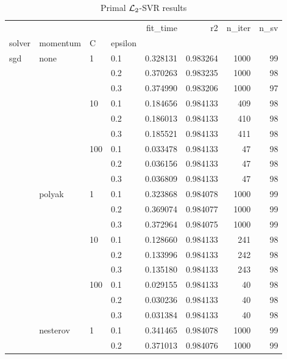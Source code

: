 \begin{table}[H]
\centering
\caption{Primal $\protect \mathcal{L}_2$-SVR results}
\label{primal_l2_svr_cv_results}
\begin{tabular}{llllrrrr}
\toprule
          &   &     &     &  fit\_time &        r2 &  n\_iter &  n\_sv \\
solver & momentum & C & epsilon &           &           &         &       \\
\midrule
sgd & none & 1   & 0.1 &  0.328131 &  0.983264 &    1000 &    99 \\
          &   &     & 0.2 &  0.370263 &  0.983235 &    1000 &    98 \\
          &   &     & 0.3 &  0.374990 &  0.983206 &    1000 &    97 \\
          &   & 10  & 0.1 &  0.184656 &  0.984133 &     409 &    98 \\
          &   &     & 0.2 &  0.186013 &  0.984133 &     410 &    98 \\
          &   &     & 0.3 &  0.185521 &  0.984133 &     411 &    98 \\
          &   & 100 & 0.1 &  0.033478 &  0.984133 &      47 &    98 \\
          &   &     & 0.2 &  0.036156 &  0.984133 &      47 &    98 \\
          &   &     & 0.3 &  0.036809 &  0.984133 &      47 &    98 \\
          & polyak & 1   & 0.1 &  0.323868 &  0.984078 &    1000 &    99 \\
          &   &     & 0.2 &  0.369074 &  0.984077 &    1000 &    99 \\
          &   &     & 0.3 &  0.372964 &  0.984075 &    1000 &    99 \\
          &   & 10  & 0.1 &  0.128660 &  0.984133 &     241 &    98 \\
          &   &     & 0.2 &  0.133996 &  0.984133 &     242 &    98 \\
          &   &     & 0.3 &  0.135180 &  0.984133 &     243 &    98 \\
          &   & 100 & 0.1 &  0.029155 &  0.984133 &      40 &    98 \\
          &   &     & 0.2 &  0.030236 &  0.984133 &      40 &    98 \\
          &   &     & 0.3 &  0.031384 &  0.984133 &      40 &    98 \\
          & nesterov & 1   & 0.1 &  0.341465 &  0.984078 &    1000 &    99 \\
          &   &     & 0.2 &  0.371013 &  0.984076 &    1000 &    99 \\

\end{tabular}
\end{table}
